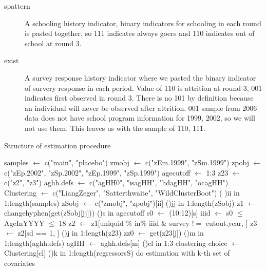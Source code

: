 \begin{description}
\vspace{1.0ex}\setlength{\itemsep}{1.0ex}\setlength{\baselineskip}{12pt}
\item[spattern]	A schooling history indicator, binary indicators for schooling in each round is pasted together, so 111 indicates always goers and 110 indicates out of school at round 3. 
\item[exist]	A survey response history indicator where we pasted the binary indicator of survery response in each period. Value of \textsf{110} is attrition at round 3, \textsf{001} indicates first observed in round 3. There is no \textsf{101} by definition because an individual will never be observed after attrition. \textsf{001} sample from 2006 data does not have school program information for 1999, 2002, so we will not use them. This leaves us with the sample of \textsf{110, 111}. 
\end{description}


\setlength{\baselineskip}{10pt}
\begin{algorithm}
\caption{Structure of estimation procedure}
\DontPrintSemicolon
\SetAlgoNoLine
samples $\leftarrow$ c("main", "placebo")\;
zmobj $\leftarrow$ c("zEm.1999", "zSm.1999") 
zpobj $\leftarrow$ c("zEp.2002", "zSp.2002", "zEp.1999", "zSp.1999")  
agecutoff $\leftarrow$ 1:3\;
z23 $\leftarrow$ c("z2", "z3")\;
aghh.defs $\leftarrow$ c("agHH0", "isagHH", "hdagHH", "ocagHH")\;
Clustering $\leftarrow$ c("LiangZeger", "Satterthwaite", "WildClusterBoot")\;
\For( ){ii in 1:length(samples)}{
  zSobj $\leftarrow$ c("zmobj", "zpobj")[ii]\;
  \For(){jj in 1:length(zSobj)}{
     z1 $\leftarrow$ changehyphen(get(zSobj[jj]))\;
     \For(){s in agecutoff}{
        s0 $\leftarrow$ (10:12)[s]\;
        iiid $\leftarrow$ s0 $\leqslant$ AgeInYYYY $\leqslant$ 18\;
        z2 $\leftarrow$ z1[uniquid \% in\% iiid \& survey $!=$ cutout.year, ]\;
        z3 $\leftarrow$ z2[sd == 1, ] 
        \For(){j in 1:length(z23)}{
          zz0 $\leftarrow$ get(z23[j])\;
          \For(){m in 1:length(aghh.defs)}{
            agHH $\leftarrow$ aghh.defs[m]\;
            \For(){cl in 1:3}{
              clustering choice $\leftarrow$ Clustering[cl]\;
	            \For(){k in 1:length(regressorsS)}{
	              do estimation with k-th set of covariates\;
	            }
            }
          }
        }
     }
   }
}

\end{algorithm}
\ULforem %



